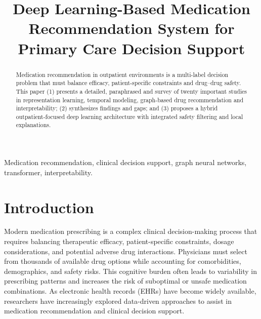 \documentclass[conference,onecolumn]{IEEEtran}
\begin{document}
\title{Deep Learning-Based Medication Recommendation System for Primary Care Decision Support}

\author{
}

\maketitle



\begin{abstract}
Medication recommendation in outpatient environments is a multi-label decision problem that must balance efficacy, patient-specific constraints and drug–drug safety. This paper (1) presents a detailed, paraphrased and survey of twenty important studies in representation learning, temporal modeling, graph-based drug recommendation and interpretability; (2) synthesizes findings and gaps; and (3) proposes a hybrid outpatient-focused deep learning architecture with integrated safety filtering and local explanations.
\end{abstract}

\begin{IEEEkeywords}
Medication recommendation, clinical decision support, graph neural networks, transformer, interpretability.
\end{IEEEkeywords}

\section{Introduction}

Modern medication prescribing is a complex clinical decision-making process that requires balancing therapeutic efficacy, patient-specific constraints, dosage considerations, and potential adverse drug interactions. Physicians must select from thousands of available drug options while accounting for comorbidities, demographics, and safety risks. This cognitive burden often leads to variability in prescribing patterns and increases the risk of suboptimal or unsafe medication combinations. As electronic health records (EHRs) have become widely available, researchers have increasingly explored data-driven approaches to assist in medication recommendation and clinical decision support.
\end{document}
